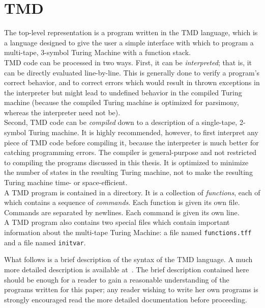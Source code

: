 \section{TMD}

The top-level representation is a program written in the TMD language, which is a language designed to give the user a simple interface with which to program a multi-tape, 3-symbol Turing Machine with a function stack. \\

TMD code can be processed in two ways. First, it can be \emph{interpreted}; that is, it can be directly evaluated line-by-line. This is generally done to verify a program's correct behavior, and to correct errors which would result in thrown exceptions in the interpreter but might lead to undefined behavior in the compiled Turing machine (because the compiled Turing machine is optimized for parsimony, whereas the interpreter need not be). \\

Second, TMD code can be \emph{compiled} down to a description of a single-tape, 2-symbol Turing machine. It is highly recommended, however, to first interpret any piece of TMD code before compiling it, because the interpreter is much better for catching programming errors. The compiler is general-purpose and not restricted to compiling the programs discussed in this thesis. It is optimized to minimize the number of states in the resulting Turing machine, not to make the resulting Turing machine time- or space-efficient. \\

A TMD program is contained in a directory. It is a collection of \emph{functions}, each of which contains a sequence of \emph{commands}. Each function is given its own file. Commands are separated by newlines. Each command is given its own line. \\

A TMD program also contains two special files which contain important information about the multi-tape Turing Machine: a file named {\tt functions.tff} and a file named {\tt initvar}.

What follows is a brief description of the syntax of the TMD language. A much more detailed description is available at~\cite{github}. The brief description contained here should be enough for a reader to gain a reasonable understanding of the programs written for this paper; any reader wishing to write her own programs is strongly encouraged read the more detailed documentation before proceeding.

